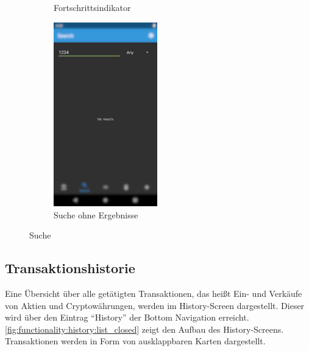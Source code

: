 \documentclass[a4paper]{article}
\begin{document}
\begin{figure}[H]
\begin{subfigure}{.5\textwidth}
		\caption{Fortschrittsindikator}
		\label{fig:functionality:search:loading}
	\end{subfigure}
	\begin{subfigure}{.5\textwidth}
		\centering
		\includegraphics[height=8cm,keepaspectratio]{./images/search/no_results.png}
		\caption{Suche ohne Ergebnisse}
		\label{fig:functionality:search:no-results}
	\end{subfigure}
	\caption{Suche}
	\label{fig:functionality:search}
\end{figure}


\subsection{Transaktionshistorie}
\label{subsec:functionality:history}
Eine Übersicht über alle getätigten Transaktionen, das heißt Ein- und Verkäufe von Aktien und Cryptowährungen, werden im History-Screen dargestellt. Dieser wird über den Eintrag ``History'' der Bottom Navigation erreicht. \autoref{fig:functionality:history:list_closed} zeigt den Aufbau des History-Screens. Transaktionen werden in Form von ausklappbaren Karten dargestellt.
\end{document}
